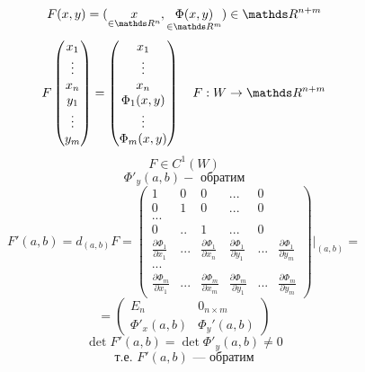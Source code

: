 \documentclass[main]{subfiles}
\begin{document}
	\begin{Proof}
		\[F(x, y) = (\us{\in \R^n}{x}, \us{\in \R^m}{\Phi(x,y)}) \in \R^{n + m}\]
		\[F \begin{pmatrix}
				x_1    \\
				\vdots \\
				x_n    \\
				y_1    \\
				\vdots \\
				y_m
			\end{pmatrix} =
			\begin{pmatrix}
				x_1         \\
				\vdots      \\
				x_n         \\
				\Phi_1(x,y) \\
				\vdots      \\
				\Phi_m(x, y)
			\end{pmatrix}
			\q F : W \to \R^{n + m} \]
		\[F \in C^{1}(W) \]
		\[\Phi'_y(a, b) - \text{ обратим}\]
		\[F'(a, b) = d_{(a, b)} F =
			\begin{pmatrix}
				1                                    & 0   & 0                                    & ... & 0 \\
				0                                    & 1   & 0                                    & ... & 0 \\
				...                                                                                         \\
				0                                    & ..  & 1                                    & ... & 0 \\
				\frac{\partial \Phi_1}{\partial x_1} & ... & \frac{\partial \Phi_1}{\partial x_n} &
				\frac{\partial \Phi_1}{\partial y_1} & ... & \frac{\partial \Phi_1}{\partial y_m}           \\
				...                                                                                         \\
				\frac{\partial \Phi_m}{\partial x_1} & ... & \frac{\partial \Phi_m}{\partial x_m} &
				\frac{\partial \Phi_m}{\partial y_1} & ... & \frac{\partial \Phi_m}{\partial y_m}
			\end{pmatrix} \Bigg|_{(a, b)} = \]
		\[= \begin{pmatrix}
				E_n           & 0_{n \times m} \\
				\Phi'_x(a, b) & \Phi_y'(a, b)
			\end{pmatrix}\]
		\[\det F'(a, b) = \det \Phi'_y(a, b) \neq 0\]
		\[\text{т.е. } F'(a, b) \text{ --- обратим} \]

\end{Proof}
\end{document}
